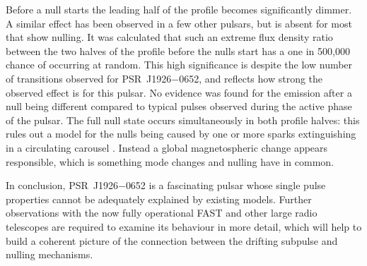Before a null starts the leading half of the profile becomes significantly dimmer. A similar effect has been observed in a few other pulsars, but is absent for most that show nulling. It was calculated that such an extreme flux density ratio between the two halves of the profile before the nulls start has a one in 500,000 chance of occurring at random. This high significance is despite the low number of transitions observed for PSR~J1926$-$0652, and reflects how strong the observed effect is for this pulsar. No evidence was found for the emission after a null being different compared to typical pulses observed during the active phase of the pulsar. The full null state occurs simultaneously in both profile halves: this rules out a model for the nulls being caused by one or more sparks extinguishing in a circulating carousel \citep[e.g.][]{RWxx2008}. Instead a global magnetospheric change appears responsible, which is something mode changes and nulling have in common.

In conclusion, PSR~J1926$-$0652 is a fascinating pulsar whose single pulse properties cannot be adequately explained by existing models. Further observations with the now fully operational FAST and other large radio telescopes are required to examine its behaviour in more detail, which will help to build a coherent picture of the connection between the drifting subpulse and nulling mechanisms. 